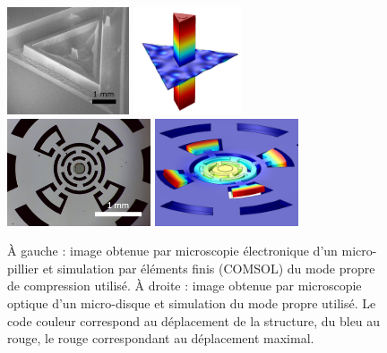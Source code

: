 \documentclass[12pt,a4paper]{article}
\begin{document}
\begin{figure}
\center
\includegraphics[height=90pt]{figures/micropillar.png}
\hfill
\includegraphics[height=90pt]{figures/micropillar_disp.png}
\hfill
\includegraphics[height=90pt]{figures/microwheel.png}
\includegraphics[height=90pt]{figures/microwheel_disp.png}
\caption{À gauche : image obtenue par microscopie électronique d'un micro-pillier et simulation par éléments finis (COMSOL) du mode propre de compression utilisé.
À droite : image obtenue par microscopie optique d'un micro-disque et simulation du mode propre utilisé.
Le code couleur correspond au déplacement de la structure, du bleu au rouge, le rouge correspondant au déplacement maximal.}
\label{fig:resonators}
\end{figure}
\end{document}
